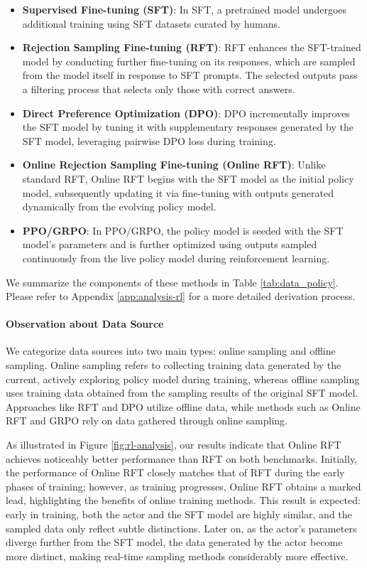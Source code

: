 \begin{itemize}[topsep=0pt]
\begin{itemize}[topsep=0pt]
\begin{itemize}
    \item  \textbf{Supervised Fine-tuning (SFT)}: In SFT, a pretrained model undergoes additional training using SFT datasets curated by humans.
    \item \textbf{Rejection Sampling Fine-tuning (RFT)}: RFT enhances the SFT-trained model by conducting further fine-tuning on its responses, which are sampled from the model itself in response to SFT prompts. The selected outputs pass a filtering process that selects only those with correct answers.
    \item \textbf{Direct Preference Optimization (DPO)}: DPO incrementally improves the SFT model by tuning it with supplementary responses generated by the SFT model, leveraging pairwise DPO loss during training.
    \item \textbf{Online Rejection Sampling Fine-tuning (Online RFT)}: Unlike standard RFT, Online RFT begins with the SFT model as the initial policy model, subsequently updating it via fine-tuning with outputs generated dynamically from the evolving policy model.
    \item \textbf{PPO/GRPO}: In PPO/GRPO, the policy model is seeded with the SFT model's parameters and is further optimized using outputs sampled continuously from the live policy model during reinforcement learning.
\end{itemize}

We summarize the components of these methods in Table \ref{tab:data_policy}.
Please refer to Appendix \ref{app:analysis-rl} for a more detailed derivation process.

\paragraph{Observation about Data Source} We categorize data sources into two main types: online sampling and offline sampling. Online sampling refers to collecting training data generated by the current, actively exploring policy model during training, whereas offline sampling uses training data obtained from the sampling results of the original SFT model. Approaches like RFT and DPO utilize offline data, while methods such as Online RFT and GRPO rely on data gathered through online sampling.

As illustrated in Figure \ref{fig:rl-analysis}, our results indicate that Online RFT achieves noticeably better performance than RFT on both benchmarks. Initially, the performance of Online RFT closely matches that of RFT during the early phases of training; however, as training progresses, Online RFT obtains a marked lead, highlighting the benefits of online training methods. This result is expected: early in training, both the actor and the SFT model are highly similar, and the sampled data only reflect subtle distinctions. Later on, as the actor's parameters diverge further from the SFT model, the data generated by the actor become more distinct, making real-time sampling methods considerably more effective.


\end{itemize}
\end{itemize}
